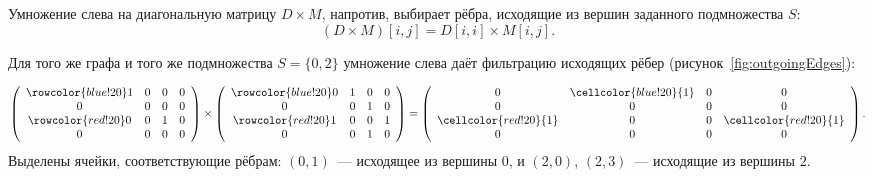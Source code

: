 Умножение слева на диагональную матрицу $D \times M$, напротив, выбирает рёбра, исходящие из вершин заданного подмножества $S$:
\[
    (D \times M)[i,j] = D[i,i] \times M[i,j].
\]

\begin{example}
    Для того же графа и того же подмножества $S = \{0, 2\}$ умножение слева даёт фильтрацию исходящих рёбер (рисунок~\ref{fig:outgoingEdges}):

\begin{marginfigure}
    \begin{center}
        
    \end{center}
    \caption{Фильтрация исходящих рёбер для вершин 0 и 2 }
    \label{fig:outgoingEdges}
\end{marginfigure}


    \[
        \left(
        \begin{array}{cccc}
            \rowcolor{blue!20}
            1 & 0 & 0 & 0 \\
            0 & 0 & 0 & 0 \\
            \rowcolor{red!20}
            0 & 0 & 1 & 0 \\
            0 & 0 & 0 & 0
        \end{array}\right)
        \times
        \left(
        \begin{array}{cccc}
            \rowcolor{blue!20}
            0 & 1 & 0 & 0 \\
            0 & 0 & 1 & 0 \\
            \rowcolor{red!20}
            1 & 0 & 0 & 1 \\
            0 & 0 & 1 & 0
        \end{array}\right)
        =
        \left(
        \begin{array}{cccc}
            0 & \cellcolor{blue!20}{1} & 0 & 0 \\
            0 & 0 & 0 & 0 \\
            \cellcolor{red!20}{1} & 0 & 0 & \cellcolor{red!20}{1} \\
            0 & 0 & 0 & 0
        \end{array}\right).
    \]
    Выделены ячейки, соответствующие рёбрам: $(0,1)$~--- исходящее из вершины $0$, и $(2,0)$, $(2,3)$~--- исходящие из вершины $2$.
\end{example}


